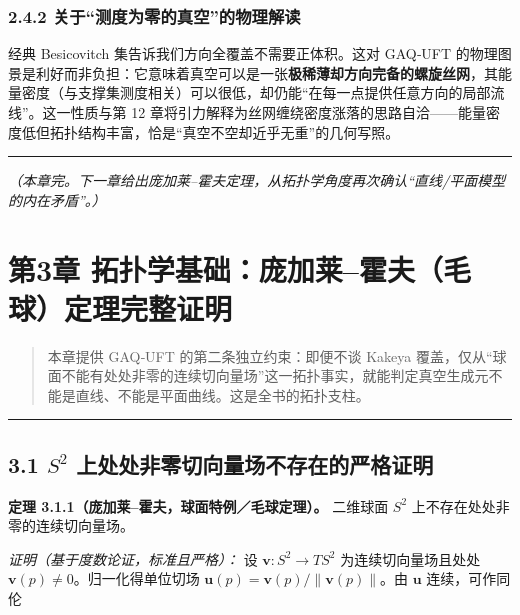 \subsubsection{2.4.2
关于``测度为零的真空''的物理解读}\label{ux5173ux4e8eux6d4bux5ea6ux4e3aux96f6ux7684ux771fux7a7aux7684ux7269ux7406ux89e3ux8bfb}

经典 Besicovitch 集告诉我们方向全覆盖不需要正体积。这对 GAQ‑UFT
的物理图景是利好而非负担：它意味着真空可以是一张\textbf{极稀薄却方向完备的螺旋丝网}，其能量密度（与支撑集测度相关）可以很低，却仍能``在每一点提供任意方向的局部流线''。这一性质与第
12
章将引力解释为丝网缠绕密度涨落的思路自洽------能量密度低但拓扑结构丰富，恰是``真空不空却近乎无重''的几何写照。

\begin{center}\rule{0.5\linewidth}{0.5pt}\end{center}

\emph{（本章完。下一章给出庞加莱--霍夫定理，从拓扑学角度再次确认``直线/平面模型的内在矛盾''。）}

\section{第3章
拓扑学基础：庞加莱--霍夫（毛球）定理完整证明}\label{ux7b2c3ux7ae0-ux62d3ux6251ux5b66ux57faux7840ux5e9eux52a0ux83b1ux970dux592bux6bdbux7403ux5b9aux7406ux5b8cux6574ux8bc1ux660e-1}

\begin{quote}
本章提供 GAQ‑UFT 的第二条独立约束：即便不谈 Kakeya
覆盖，仅从``球面不能有处处非零的连续切向量场''这一拓扑事实，就能判定真空生成元不能是直线、不能是平面曲线。这是全书的拓扑支柱。
\end{quote}

\begin{center}\rule{0.5\linewidth}{0.5pt}\end{center}

\subsection{\texorpdfstring{3.1 \(S^2\)
上处处非零切向量场不存在的严格证明}{3.1 S\^{}2 上处处非零切向量场不存在的严格证明}}\label{s2-ux4e0aux5904ux5904ux975eux96f6ux5207ux5411ux91cfux573aux4e0dux5b58ux5728ux7684ux4e25ux683cux8bc1ux660e}

\textbf{定理 3.1.1（庞加莱--霍夫，球面特例／毛球定理）。} 二维球面
\(S^2\) 上不存在处处非零的连续切向量场。

\emph{证明（基于度数论证，标准且严格）：} 设 \(\mathbf{v}:S^2\to TS^2\)
为连续切向量场且处处 \(\mathbf{v}(p)\neq 0\)。归一化得单位切场
\(\mathbf{u}(p)=\mathbf{v}(p)/\|\mathbf{v}(p)\|\)。由 \(\mathbf{u}\)
连续，可作同伦


